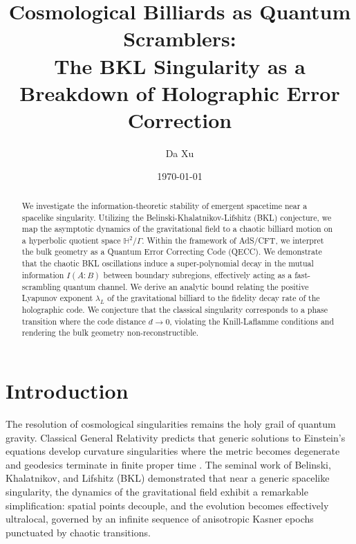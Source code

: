 \documentclass[aps,prd,reprint,nofootinbib,amsmath,amssymb,amsfonts]{revtex4-2}
\begin{document}
\title{Cosmological Billiards as Quantum Scramblers: \texorpdfstring{\\}{ }
The BKL Singularity as a Breakdown of Holographic Error Correction}

\author{Da Xu}

\date{\today}

\begin{abstract}
We investigate the information-theoretic stability of emergent spacetime near a spacelike singularity. Utilizing the Belinski-Khalatnikov-Lifshitz (BKL) conjecture, we map the asymptotic dynamics of the gravitational field to a chaotic billiard motion on a hyperbolic quotient space $\mathbb{H}^2 / \Gamma$. Within the framework of AdS/CFT, we interpret the bulk geometry as a Quantum Error Correcting Code (QECC). We demonstrate that the chaotic BKL oscillations induce a super-polynomial decay in the mutual information $I(A:B)$ between boundary subregions, effectively acting as a fast-scrambling quantum channel. We derive an analytic bound relating the positive Lyapunov exponent $\lambda_L$ of the gravitational billiard to the fidelity decay rate of the holographic code. We conjecture that the classical singularity corresponds to a phase transition where the code distance $d \to 0$, violating the Knill-Laflamme conditions and rendering the bulk geometry non-reconstructible.
\end{abstract}

\maketitle

\section{Introduction}
\label{sec:intro}

The resolution of cosmological singularities remains the holy grail of quantum gravity. Classical General Relativity predicts that generic solutions to Einstein's equations develop curvature singularities where the metric becomes degenerate and geodesics terminate in finite proper time \cite{Penrose1965,Hawking1970}. The seminal work of Belinski, Khalatnikov, and Lifshitz (BKL) \cite{bkl1970} demonstrated that near a generic spacelike singularity, the dynamics of the gravitational field exhibit a remarkable simplification: spatial points decouple, and the evolution becomes effectively ultralocal, governed by an infinite sequence of anisotropic Kasner epochs punctuated by chaotic transitions.
\end{document}

